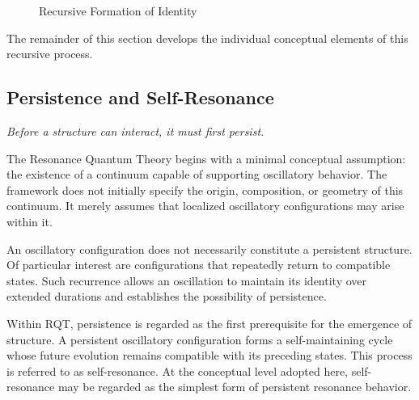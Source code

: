 \documentclass[11pt,a4paper]{article}
\begin{document}
\begin{figure}[!ht]
\centering


\caption{Recursive Formation of Identity}
\label{fig:rqt_identity}
\end{figure}

The remainder of this section develops the individual conceptual elements of this recursive process.

\subsection{Persistence and Self-Resonance}

\emph{Before a structure can interact, it must first persist.}

The Resonance Quantum Theory begins with a minimal conceptual assumption: the existence of a continuum capable of supporting oscillatory behavior. The framework does not initially specify the origin, composition, or geometry of this continuum. It merely assumes that localized oscillatory configurations may arise within it.

An oscillatory configuration does not necessarily constitute a persistent structure. Of particular interest are configurations that repeatedly return to compatible states. Such recurrence allows an oscillation to maintain its identity over extended durations and establishes the possibility of persistence.

Within RQT, persistence is regarded as the first prerequisite for the emergence of structure. A persistent oscillatory configuration forms a self-maintaining cycle whose future evolution remains compatible with its preceding states. This process is referred to as self-resonance. At the conceptual level adopted here, self-resonance may be regarded as the simplest form of persistent resonance behavior.
\end{document}
